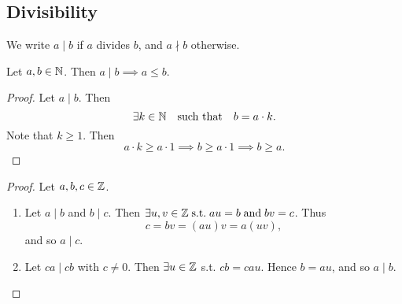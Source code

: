 \documentclass[11pt,openany]{article}
\begin{document}
\subsection{Divisibility}
\begin{remark*}
	We write $a\mid b$ if $a$ divides $b$, and $a\nmid b$ otherwise. 
\end{remark*}
\begin{remark*}
	Let $a,b\in\mathbb{N}$. Then $a\mid b\implies a\leq b$.
	\begin{proof}	
		Let \(a \mid b\). Then \[
		\exists k\in\mathbb{N}\quad\text{such that}\quad b = a\cdot k.
		\] Note that \(k \ge 1\). Then \[
		a\cdot k\geq a\cdot 1\implies b\geq a\cdot 1\implies b\geq a.
		\]
	\end{proof}
\end{remark*}
\vfill
{}
\begin{proof}
	Let $a,b,c\in\mathbb{Z}$. \begin{enumerate}[(1)]
		\item Let $a\mid b$ and $b\mid c$. Then $\exists u, v\in\mathbb{Z}\;\text{s.t.}\; au=b\;\text{and}\; bv=c$. Thus $$c=bv=(au)v=a(uv),$$ and so $a\mid c$.
		\item Let $ca\mid cb$ with $c\neq 0$. Then $\exists u\in\mathbb{Z}$ s.t. $cb=cau$. Hence $b=au$, and so $a\mid b$.
	\end{enumerate}
\end{proof}
\end{document}
